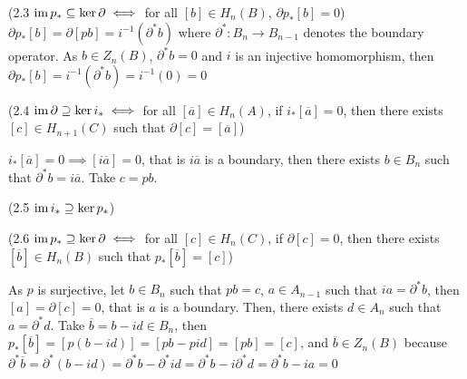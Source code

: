 \documentclass{report}
\begin{document}
\begin{longproof}
    (2.3 $\operatorname{im} p_* \subseteq \ker \partial \iff $ for all $[b] \in H_n(B)$, $\partial p_* [b] = 0$) $\partial p_* [b] = \partial [p b] = i^{-1}(\partial^* b)$ where $\partial^*: B_n \to B_{n-1}$ denotes the boundary operator. As $b \in Z_n(B)$, $\partial^* b = 0$ and $i$ is an injective homomorphism, then $\partial p_* [b] = i^{-1}(\partial^* b) = i^{-1}(0) = 0$

    (2.4 $\operatorname{im} \partial \supseteq \ker i_* \iff$ for all $[\overline{a}] \in H_n(A)$, if $i_* [\overline{a}] = 0$, then there exists $[c] \in H_{n+1}(C)$ such that $\partial [c] = [\overline{a}]$)

    $i_*[\overline{a}] = 0 \implies [i\overline{a}] = 0$, that is $i \overline{a}$ is a boundary, then there exists $b \in B_n$ such that $\partial^* b = i \overline{a}$. Take $c = pb$.
    
    (2.5 $\operatorname{im} i_* \supseteq \ker p_*$)
    
    (2.6 $\operatorname{im} p_* \supseteq \ker \partial \iff$ for all $[c] \in H_n(C)$, if $\partial [c] = 0$, then there exists $[\overline{b}] \in H_n(B)$ such that $p_*[\overline{b}] = [c]$)

\begin{center}
\end{center}

    As $p$ is surjective, let $b \in B_n$ such that $pb = c$, $a \in A_{n-1}$ such that $ia = \partial^* b$, then $[a] = \partial [c] = 0$, that is $a$ is a boundary. Then, there exists $d \in A_n$ such that $a = \partial^* d$. Take $\overline{b} = b - id \in B_n$, then $p_*[\overline{b}] = [p(b - id)] = [pb - pid] = [pb] = [c]$, and $\overline{b} \in Z_n(B)$ because $\partial^* \overline{b} = \partial^*(b - id) = \partial^* b - \partial^* id = \partial^* b - i \partial^* d = \partial^* b - ia = 0$

\end{longproof}
\end{document}
